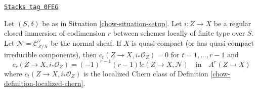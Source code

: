 \begin{lemma}
\label{chow-lemma-agreement-with-loc-chern}
\href{https://stacks.math.columbia.edu/tag/0FEG}{\texttt{Stacks tag 0FEG}}

Let $(S, \delta)$ be as in Situation \ref{chow-situation-setup}. Let $i : Z \to X$
be a regular closed immersion of codimension $r$
between schemes locally of finite type over $S$.
Let $\mathcal{N} = \mathcal{C}_{Z/X}^\vee$ be the normal sheaf. If $X$
is quasi-compact (or has quasi-compact irreducible components), then
$c_t(Z \to X, i_*\mathcal{O}_Z) = 0$ for $t = 1, \ldots, r - 1$ and
$$
c_r(Z \to X, i_*\mathcal{O}_Z) = (-1)^{r - 1} (r - 1)! c(Z \to X, \mathcal{N})
\quad\text{in}\quad
A^r(Z \to X)
$$
where $c_t(Z \to X, i_*\mathcal{O}_Z)$
is the localized Chern class
of Definition \ref{chow-definition-localized-chern}.
\end{lemma}

